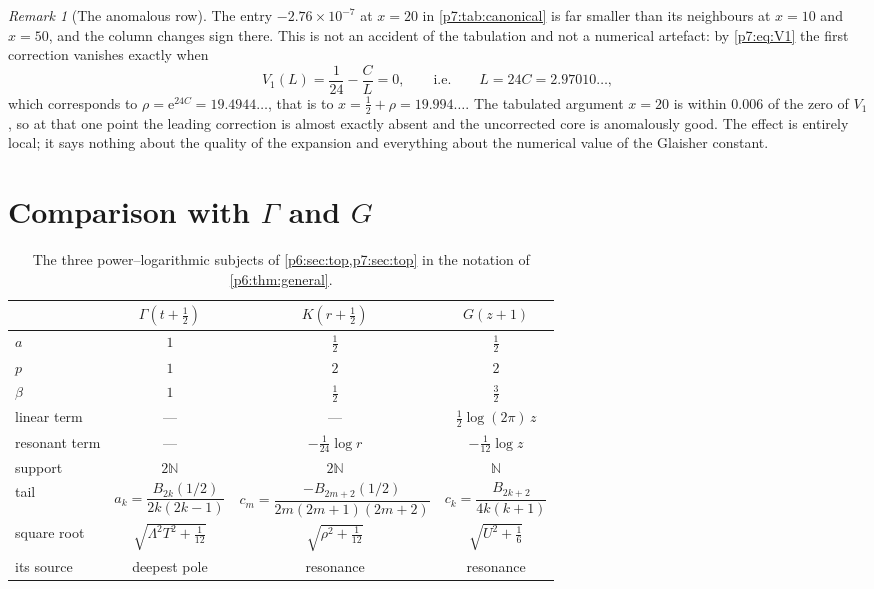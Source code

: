 \documentclass[11pt,a4paper,oneside]{book}
\theoremstyle{plain}
\theoremstyle{definition}
\theoremstyle{remark}
\newtheorem{remark}[theorem]{Remark}
\newcommand{\Nat}{\mathbb{N}}
\newcommand{\e}{\mathrm{e}}
\begin{document}
\begin{remark}[The anomalous row]\label{p7:rem:anomaly}
The entry $-2.76\times10^{-7}$ at $x=20$ in \cref{p7:tab:canonical} is far
smaller than its neighbours at $x=10$ and $x=50$, and the column changes sign
there.  This is not an accident of the tabulation and not a numerical
artefact: by \eqref{p7:eq:V1} the first correction vanishes exactly when
\begin{equation}\label{p7:eq:V1-zero}
 V_1(L)=\frac1{24}-\frac CL=0,
 \qquad\text{i.e.}\qquad
 L=24C=2.97010\ldots,
\end{equation}
which corresponds to $\rho=\e^{24C}=19.4944\ldots$, that is to
$x=\tfrac12+\rho=19.994\ldots$.  The tabulated argument $x=20$ is within
$0.006$ of the zero of $V_1$, so at that one point the leading correction is
almost exactly absent and the uncorrected core is anomalously good.  The
effect is entirely local; it says nothing about the quality of the expansion
and everything about the numerical value of the Glaisher constant.
\end{remark}

\section{Comparison with \texorpdfstring{$\Gamma$}{Gamma} and
\texorpdfstring{$G$}{G}}
\label{p7:sec:comparison}

\begin{table}[htbp]
\centering
\caption{The three power--logarithmic subjects of
\cref{p6:sec:top,p7:sec:top} in the notation of \cref{p6:thm:general}.}
\label{p7:tab:three-subjects}
\small
\begin{tabular}{@{}lccc@{}}
\toprule
 & $\Gamma(t+\tfrac12)$ & $K(r+\tfrac12)$ & $G(z+1)$\\
\midrule
$a$ & $1$ & $\tfrac12$ & $\tfrac12$\\
$p$ & $1$ & $2$ & $2$\\
$\beta$ & $1$ & $\tfrac12$ & $\tfrac32$\\
linear term & --- & --- & $\tfrac12\log(2\pi)\,z$\\
resonant term & --- & $-\tfrac1{24}\log r$ & $-\tfrac1{12}\log z$\\
support & $2\Nat$ & $2\Nat$ & $\Nat$\\
tail & $a_k=\dfrac{B_{2k}(1/2)}{2k(2k-1)}$
     & $c_m=\dfrac{-B_{2m+2}(1/2)}{2m(2m+1)(2m+2)}$
     & $c_k=\dfrac{B_{2k+2}}{4k(k+1)}$\\[0.6em]
square root & $\sqrt{\Lambda^{2}T^{2}+\tfrac1{12}}$
            & $\sqrt{\rho^{2}+\tfrac1{12}}$
            & $\sqrt{U^{2}+\tfrac16}$\\
its source & deepest pole & resonance & resonance\\
\bottomrule
\end{tabular}
\end{table}
\end{document}
